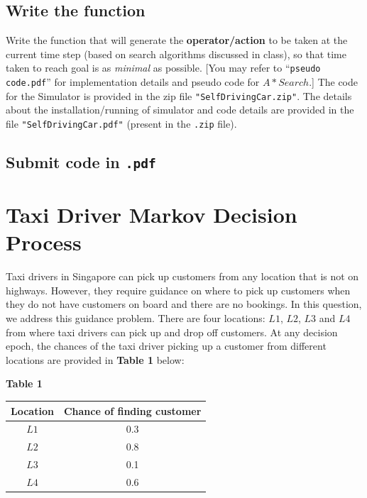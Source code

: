 \documentclass[12pt, letterpaper]{article}
\newcommand{\mybox}[1]{\par\noindent\colorbox{shadecolor}
{\parbox{\dimexpr\textwidth-2\fboxsep\relax}{#1}}}
\begin{document}
\subsection{Write the function}
\mybox{Write the function that will generate the \textbf{operator/action} to be taken at the current time step (based on search algorithms discussed in class), so that time taken to reach goal is as \textit{minimal} as possible. 
[You may refer to “\texttt{pseudo code.pdf}” for implementation details and pseudo code for $A* Search$.]
The code for the Simulator is provided in the zip file \texttt{"SelfDrivingCar.zip"}. The details about the
installation/running of simulator and code details are provided in the file \texttt{"SelfDrivingCar.pdf"}
(present in the \texttt{.zip} file).}

\subsection{Submit code in \texttt{.pdf}}

\section{Taxi Driver Markov Decision Process}
\mybox{Taxi drivers in Singapore can pick up customers from any location that is not on highways. 
However, they require guidance on where to pick up customers when they do not have customers on board and there are no bookings. 
In this question, we address this guidance problem. 
There are four locations: $L1$, $L2$, $L3$ and $L4$ from where taxi drivers can pick up and drop off customers. 
At any decision epoch, the chances of the taxi driver picking up a customer from different locations are provided in \textbf{Table 1} below:}

\begin{center}
    \textbf{Table 1}

    \begin{tabular}{|c|c|} 
    \hline
    Location & Chance of finding customer\\ 
    \hline
    $L1$ & 0.3 \\
    \hline
    $L2$ & 0.8 \\
    \hline
    $L3$ & 0.1 \\
    \hline
    $L4$ & 0.6 \\
    \hline
    \end{tabular}
    
\end{center}
\end{document}
